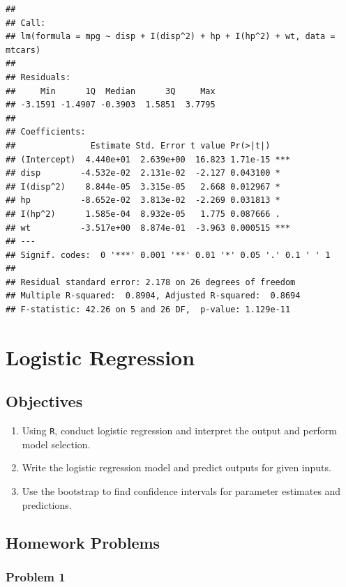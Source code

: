 \documentclass[
]{book}
\providecommand{\tightlist}{%
  \setlength{\itemsep}{0pt}\setlength{\parskip}{0pt}}
\begin{document}
\begin{verbatim}
## 
## Call:
## lm(formula = mpg ~ disp + I(disp^2) + hp + I(hp^2) + wt, data = mtcars)
## 
## Residuals:
##     Min      1Q  Median      3Q     Max 
## -3.1591 -1.4907 -0.3903  1.5851  3.7795 
## 
## Coefficients:
##               Estimate Std. Error t value Pr(>|t|)    
## (Intercept)  4.440e+01  2.639e+00  16.823 1.71e-15 ***
## disp        -4.532e-02  2.131e-02  -2.127 0.043100 *  
## I(disp^2)    8.844e-05  3.315e-05   2.668 0.012967 *  
## hp          -8.652e-02  3.813e-02  -2.269 0.031813 *  
## I(hp^2)      1.585e-04  8.932e-05   1.775 0.087666 .  
## wt          -3.517e+00  8.874e-01  -3.963 0.000515 ***
## ---
## Signif. codes:  0 '***' 0.001 '**' 0.01 '*' 0.05 '.' 0.1 ' ' 1
## 
## Residual standard error: 2.178 on 26 degrees of freedom
## Multiple R-squared:  0.8904, Adjusted R-squared:  0.8694 
## F-statistic: 42.26 on 5 and 26 DF,  p-value: 1.129e-11
\end{verbatim}

\hypertarget{LOGREG}{%
\chapter{Logistic Regression}\label{LOGREG}}

\hypertarget{objectives-29}{%
\section{Objectives}\label{objectives-29}}

\begin{enumerate}
\def\labelenumi{\arabic{enumi})}
\tightlist
\item
  Using \texttt{R}, conduct logistic regression and interpret the output and perform model selection.\\
\item
  Write the logistic regression model and predict outputs for given inputs.\\
\item
  Use the bootstrap to find confidence intervals for parameter estimates and predictions.
\end{enumerate}

\hypertarget{homework-problems}{%
\section{Homework Problems}\label{homework-problems}}

\hypertarget{problem-1-30}{%
\subsection{Problem 1}\label{problem-1-30}}
\end{document}
